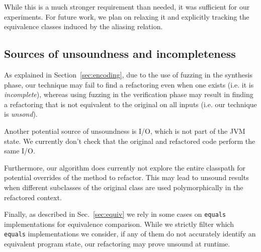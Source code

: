 \documentclass[sigconf,review,anonymous]{acmart}
\begin{document}
While this is a much stronger requirement than needed, it was sufficient for our experiments.
For future work, we plan on relaxing it and explicitly tracking the equivalence classes induced by the aliasing
relation.




\subsection{Sources of unsoundness and incompleteness}\label{sec:incompleteness}
As explained in Section~\ref{sec:encoding}, due to the use of fuzzing in the synthesis
phase, our technique may fail to find a refactoring even when one
exists (i.e. it is {\em incomplete}), whereas using fuzzing in the verification phase may result in finding a refactoring that is not equivalent to the original on all
inputs (i.e. our technique is {\em unsond}).

Another potential source of unsoundness is I/O,
which is not part of the JVM state. We currently don't check
that the original and refactored code perform the same I/O.

Furthermore, our algorithm does currently not explore the entire classpath for
potential overrides of the method to refactor. This may lead to unsound results
when different subclasses of the original class are used polymorphically in the
refactored context.

Finally, as described in Sec.~\ref{sec:equiv} we rely in some cases on
\texttt{equals} implementations for equivalence comparison.  While we
strictly filter which \texttt{equals} implementations we consider, if any of
them do not accurately identify an equivalent program state, our refactoring
may prove unsound at runtime.
\end{document}
